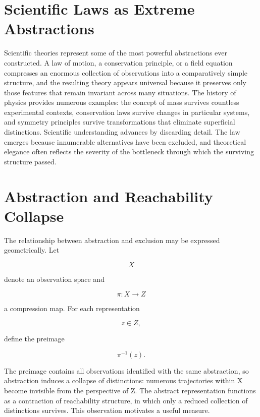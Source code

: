 \documentclass[11pt,oneside]{book}
\theoremstyle{plain}
\theoremstyle{definition}
\theoremstyle{remark}
\begin{document}
\section{Scientific Laws as Extreme Abstractions}

Scientific theories represent some of the most powerful abstractions ever constructed. A law of motion, a conservation principle, or a field equation compresses an enormous collection of observations into a comparatively simple structure, and the resulting theory appears universal because it preserves only those features that remain invariant across many situations. The history of physics provides numerous examples: the concept of mass survives countless experimental contexts, conservation laws survive changes in particular systems, and symmetry principles survive transformations that eliminate superficial distinctions. Scientific understanding advances by discarding detail. The law emerges because innumerable alternatives have been excluded, and theoretical elegance often reflects the severity of the bottleneck through which the surviving structure passed.

\section{Abstraction and Reachability Collapse}

The relationship between abstraction and exclusion may be expressed geometrically. Let

\begin{equation}
X
\end{equation}

denote an observation space and

\begin{equation}
\pi : X
\rightarrow Z
\end{equation}

a compression map. For each representation

\begin{equation}
z
\in Z,
\end{equation}

define the preimage

\begin{equation}
\pi^{-1}(z).
\end{equation}

The preimage contains all observations identified with the same abstraction, so abstraction induces a collapse of distinctions: numerous trajectories within X become invisible from the perspective of Z. The abstract representation functions as a contraction of reachability structure, in which only a reduced collection of distinctions survives. This observation motivates a useful measure.
\end{document}
